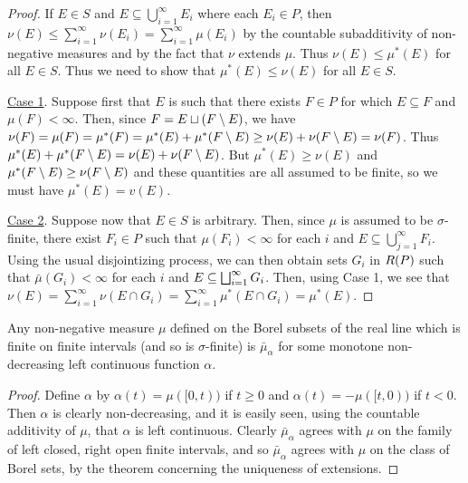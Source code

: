 \begin{proof}
If $E \in S$ and $E \subseteq \bigcup_{i=1}^\infty E_i$ where each $E_i \in P$, then $\nu(E) \leq \sum_{i=1}^\infty \nu(E_i)=\sum_{i=1}^\infty \mu(E_i)$ by the countable subadditivity of non-negative measures and by the fact that $\nu$ extends $\mu$. Thus $\nu(E) \leq \mu^*(E)$ for all $E \in S$. Thus we need to show that $\mu^*(E) \leq \nu(E)$ for all $E \in S$.

\underline{Case 1}. Suppose first that $E$ is such that there exists $F \in P$ for which $E \subseteq F$ and $\mu(F)<\infty$. Then, since $F=E \sqcup(F\setminus E)$, we have $\nu(F)=\mu(F)=\mu^*(F)=\mu^*(E)+\mu^*(F\setminus E) \geq \nu(E)+\nu(F\setminus E)=\nu(F)$. Thus $\mu^*(E)+\mu^*(F\setminus E)=\nu(E)+\nu(F\setminus E)$. But $\mu^*(E) \geq \nu(E)$ and $\mu^*(F\setminus E) \geq \nu(F\setminus E)$ and these quantities are all assumed to be finite, so we must have $\mu^*(E)=v(E) .$

\underline{Case 2}. Suppose now that $E \in S$ is arbitrary. Then, since $\mu$ is assumed to be $\sigma$-finite, there exist $F_i \in P$ such that $\mu\left(F_i\right)<\infty$ for each $i$ and $E \subseteq \bigcup_{j=1}^\infty F_i .$ Using the usual disjointizing process, we can then obtain sets ${G}_i$ in $R(P)$ such that $\bar{\mu}\left({G}_i\right)<\infty$ for each $i$ and $E \subseteq \bigsqcup_{i=1}^\infty {G}_i$. Then, using Case 1, we see that $\nu(E)=\sum_{i=1}^\infty \nu\left(E \cap {G}_i\right)=\sum_{i=1}^\infty \mu^*\left(E \cap G_i\right)=\mu^*(E)$.
\end{proof}

\begin{corollary}
Any non-negative measure $\mu$ defined on the Borel subsets of the real line which is finite on finite intervals (and so is $\sigma$-finite) is $\bar{\mu}_\alpha$ for some monotone non-decreasing left continuous function $\alpha$.
\end{corollary}

\begin{proof}
Define $\alpha$ by $\alpha(t)=\mu([0, t))$ if $t \geq 0$ and $\alpha(t)=-\mu([t, 0))$ if $t<0$. Then $\alpha$ is clearly non-decreasing, and it is easily seen, using the countable additivity of $\mu$, that $\alpha$ is left continuous. Clearly $\bar{\mu}_\alpha$ agrees with $\mu$ on the family of left closed, right open finite intervals, and so $\bar{\mu}_\alpha$ agrees with $\mu$ on the class of Borel sets, by the theorem concerning the uniqueness of extensions.
\end{proof}

